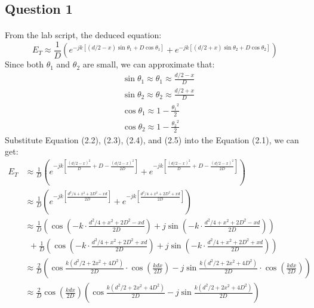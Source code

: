 \documentclass[12pt]{article}
\begin{document}
    \subsection{Question 1}
    \paragraph{}
    From the lab script\cite{3}, the deduced equation:
    \begin{equation}
                    E_T \approx \frac{1}{D} \left( e^{-jk[(d/2 - x) \sin{\theta_1}+D \cos{\theta_1}]} + e^{-jk[ (d/2 + x) \sin{\theta_2}+D \cos{\theta_2}]} \right)
    \end{equation}
    Since both  $\theta_1$ and $\theta_2$ are small, we can approximate that\cite{3}:
    \begin{align}
                    &\sin{\theta_1}\approx\theta_1 \approx \frac{d / 2 - x}{D} \\
                    &\sin{\theta_2}\approx\theta_2 \approx \frac{d / 2 + x}{D} \\
                    &\cos{\theta_1} \approx 1 - \frac{{\theta_1} ^2}{2} \\
                    &\cos{\theta_2} \approx 1 - \frac{{\theta_2} ^2}{2}
                \end{align}
    Substitute Equation (2.2), (2.3), (2.4), and (2.5) into the Equation (2.1), we can get:
    \begin{align*}
                    E_T &\approx \frac{1}{D} \left( e^{-jk[\frac{(d/2 - x) ^ 2}{D} + D - \frac{(d/2 - x) ^ 2}{2D}]} + e^{-jk[\frac{(d/2 - x) ^ 2}{D} + D - \frac{(d/2 - x) ^ 2}{2D}]} \right) \\
                    &\approx \frac{1}{D} \left( e^{-jk[\frac{d^2 / 4 + x^2 + 2D^2 - xd}{2D}]} + e^{-jk[\frac{d^2 / 4 + x^2 + 2D^2 + xd}{2D}]} \right) \\
                    &\approx \frac{1}{D} \left( \cos\left({-k\cdot\frac{d^2 / 4 + x^2 + 2D^2 - xd}{2D}}\right) + j\sin\left({-k\cdot\frac{d^2 / 4 + x^2 + 2D^2 - xd}{2D}}\right) \right) \\&\ \  +\frac{1}{D} \left( \cos\left({-k\cdot\frac{d^2 / 4 + x^2 + 2D^2 + xd}{2D}}\right) + j\sin\left({-k\cdot\frac{d^2 / 4 + x^2 + 2D^2 + xd}{2D}}\right) \right) \\
                    &\approx \frac{2}{D} \left( \cos\frac{k(d^2/2 + 2x^2 + 4D^2)}{2D} \cdot \cos (\frac{kdx}{2D}) - j\sin\frac{k(d^2/2 + 2x^2 + 4D^2)}{2D} \cdot \cos (\frac{kdx}{2D}) \right)\\
                    &\approx \frac{2}{D}\cos (\frac{kdx}{2D}) \left( \cos\frac{k(d^2/2 + 2x^2 + 4D^2)}{2D} - j\sin\frac{k(d^2/2 + 2x^2 + 4D^2)}{2D}  \right)
                \end{align*}
\end{document}
